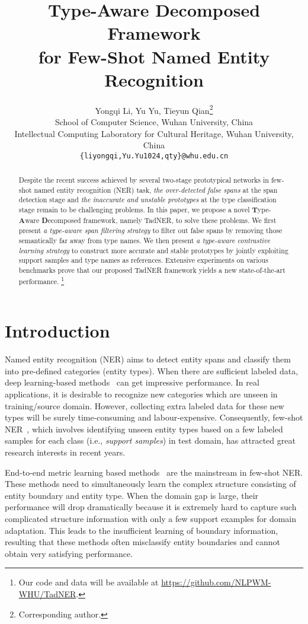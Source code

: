 \documentclass[11pt]{article}
\title{Type-Aware Decomposed Framework \\for Few-Shot Named Entity Recognition}
\author{Yongqi Li, Yu Yu, Tieyun Qian\thanks{{ }{ }Corresponding author.}\\
         School of Computer Science, Wuhan University, China \\ 
         Intellectual Computing Laboratory for Cultural Heritage, Wuhan University, China\\
        \texttt{\{liyongqi,Yu.Yu1024,qty\}@whu.edu.cn}}
\newcommand{\ours}{{TadNER}\xspace}
\begin{document}
\maketitle

\begin{abstract}
Despite the recent success achieved by several two-stage prototypical networks in few-shot named entity recognition (NER) task, \emph{the over-detected false spans} at the span detection stage and \emph{the inaccurate and unstable prototypes} at the type classification stage remain to be challenging problems.
In this paper, we propose a novel \textbf{T}ype-\textbf{A}ware \textbf{D}ecomposed framework, namely \ours, to solve these problems.
We first present \emph{a type-aware span filtering strategy} to filter out false spans by removing those semantically far away from type names. We then present \emph{a type-aware contrastive learning strategy} to construct more accurate and stable prototypes by jointly exploiting support samples and type names as references.
Extensive experiments on various benchmarks prove that our proposed \ours framework yields a new state-of-the-art performance.
\footnote{Our code and data will be available at \url{https://github.com/NLPWM-WHU/TadNER}.}
\end{abstract}




\section{Introduction}
Named entity recognition (NER) aims to detect entity spans and classify them into pre-defined categories (entity types). When there are sufficient labeled data, deep learning-based methods~\cite{huang2015bidirectional,ma2016end,lample2016neural,chiu2016named} can get impressive performance. In real applications, it is desirable to recognize new categories which are unseen in training/source domain. However, collecting extra labeled data for these new types will be surely time-consuming and labour-expensive. Consequently, few-shot NER~\cite{fritzler-2019,yang-katiyar-2020-simple}, which involves identifying unseen entity types based on a few labeled samples for each class (i.e., \emph{support samples}) in test domain, has attracted great research interests in recent years.


End-to-end metric learning based methods~\cite{yang-katiyar-2020-simple,das-etal-2022-container} are the mainstream in few-shot NER.
These methods need to simultaneously learn the complex structure consisting of entity boundary and  entity type. When the domain gap is large, their performance will drop dramatically because it is extremely hard to capture such complicated structure information with  only a few support examples for domain adaptation.  This leads to the insufficient learning of boundary information, resulting that these methods often misclassify entity boundaries and cannot obtain very satisfying performance.
\end{document}

